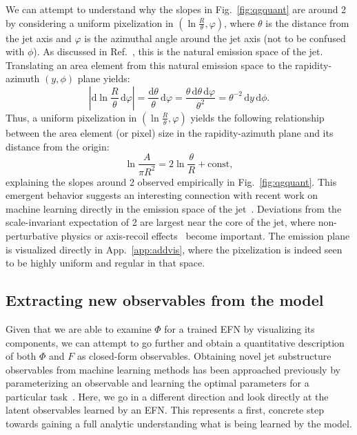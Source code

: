 \documentclass[letterpaper,11pt]{article}
\DeclareRobustCommand{\App}[1]{App.~\ref{#1}}
\DeclareRobustCommand{\Fig}[1]{Fig.~\ref{#1}}
\DeclareRobustCommand{\Ref}[1]{Ref.~\cite{#1}}
\begin{document}
We can attempt to understand why the slopes in \Fig{fig:qgquant} are around 2 by considering a uniform pixelization in $(\ln \frac{R}{\theta}, \varphi)$, where $\theta$ is the distance from the jet axis and $\varphi$ is the azimuthal angle around the jet axis (not to be confused with $\phi$).
%
As discussed in \Ref{Dreyer:2018nbf}, this is the natural emission space of the jet.
%
Translating an area element from this natural emission space to the rapidity-azimuth $(y,\phi)$ plane yields:
%
\begin{equation}
\left|\text{d}\ln\frac{R}{\theta}\, \text{d}\varphi \right| = \frac{\text{d}\theta}{\theta}\,\text{d}\varphi = \frac{\theta\, \text{d}\theta\,\text{d}\varphi}{\theta^2} =\theta^{-2}\,\text{d}y\,\text{d}\phi. 
\end{equation}
%
Thus, a uniform pixelization in $(\ln \frac{R}{\theta}, \varphi)$ yields the following relationship between the area element (or pixel) size in the rapidity-azimuth plane and its distance from the origin:
%
\begin{equation}
\label{eq:slope_two}
\ln \frac{A}{\pi R^2} = 2\ln \frac{\theta}{R} + \text{const},
\end{equation}
%
explaining the slopes around 2 observed empirically in \Fig{fig:qgquant}.
%
This emergent behavior suggests an interesting connection with recent work on machine learning directly in the emission space of the jet~\cite{Dreyer:2018nbf}.
%
Deviations from the scale-invariant expectation of 2 are largest near the core of the jet, where non-perturbative physics or axis-recoil effects~\cite{Larkoski:2014uqa} become important.
%
The emission plane is visualized directly in \App{app:addvis}, where the pixelization is indeed seen to be highly uniform and regular in that space.

\afterpage{\clearpage}




\subsection{Extracting new observables from the model}
\label{sec:newobs}

Given that we are able to examine $\Phi$ for a trained EFN by visualizing its components, we can attempt to go further and obtain a quantitative description of both $\Phi$ and $F$ as closed-form observables.
%
Obtaining novel jet substructure observables from machine learning methods has been approached previously by parameterizing an observable and learning the optimal parameters for a particular task~\cite{Datta:2017lxt}.
%
Here, we go in a different direction and look directly at the latent observables learned by an EFN.
%
This represents a first, concrete step towards gaining a full analytic understanding what is being learned by the model.
\end{document}
